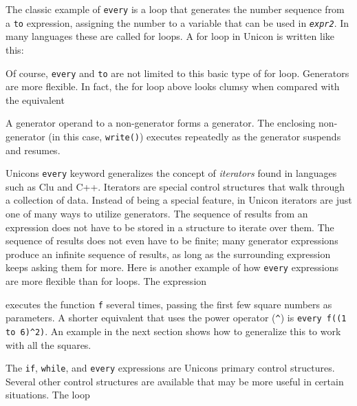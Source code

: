 The classic example of \texttt{every} is a loop that generates the
number sequence from a \texttt{to} expression, assigning the number to
a variable that can be used in \texttt{\textit{expr2}}. In many
languages these are called {\textquotedbl}for{\textquotedbl} loops. A
for loop in Unicon is written like this:


Of course, \texttt{every} and \texttt{to} are not limited to this basic
type of for loop. Generators are more flexible. In fact, the for loop
above looks clumsy when compared with the equivalent


A generator operand to a non-generator forms a generator. The enclosing
non-generator (in this case, \texttt{write()}) executes repeatedly as
the generator suspends and resumes.

Unicon{\textquotesingle}s \texttt{every} keyword generalizes the concept
of \textit{iterator}\textit{s} found in languages such
as Clu and C++. Iterators are special control structures that walk
through a collection of data. Instead of being a special feature, in
Unicon iterators are just one of many ways to utilize generators. The
sequence of results from an expression does
not have to be stored in a structure to iterate over them. The sequence
of results does not even have to be finite; many
generator expressions produce an infinite sequence of
results, as long as the surrounding expression keeps asking them for
more. Here is another example of how \texttt{every} expressions are
more flexible than for loops. The expression


\noindent
executes the function \texttt{f} several times, passing the first few
square numbers as parameters. A shorter equivalent that uses the power
operator (\texttt{\^{}}) is \texttt{every f((1 to 6)\^{}2)}. An example
in the next section shows how to generalize this to work with all the
squares.

The \texttt{if}, \texttt{while}, and \texttt{every} expressions are
Unicon{\textquotesingle}s primary control structures. Several other
control structures are available that may be more useful in certain
situations. The loop


